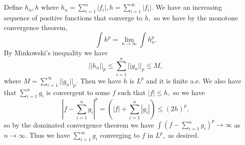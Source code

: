 \documentclass{article}
\begin{document}
\section{} %
Define $h_n,h$ where $h_n=\sum_{i=1}^n |f_i|, h=\sum_{i=1}^{\infty} |f_i|.$ We have an increasing sequence of positive functions that converge to $h,$ so we 
have by the monotone convergence theorem, $$\int h^p = \lim_{n \to \infty} \int h_n^p. $$ By Minkowski's inequality we have $$||h_n ||_p \leq \sum_{i=1}^n 
|| g_n||_p \leq M,$$ where $M=\sum_{i=1}^{\infty} || g_n||_p.$ Then we have $h$ is $L^p$ and it is finite a.e. We also have that $\sum_{i=1}^n g_i$ is 
convergent to some $f$ such that $|f| \leq h,$ so we have $$\left| f- \sum_{i=1}^n g_i \right|^p=\left(|f| + \sum_{i=1}^n |g_i|  \right) \leq (2h)^p,$$ so 
by the dominated convergence theorem we have $\int (f- \sum_{i=1}^n g_i)^p \to \infty$ as $n \to \infty.$ Thus we have $\sum_{i=1}^{\infty} g_i$ converging 
to $f$ in $L^p,$ as desired.   
\section{} %
\section{} %

\section{} %

\section{} %
\end{document}
